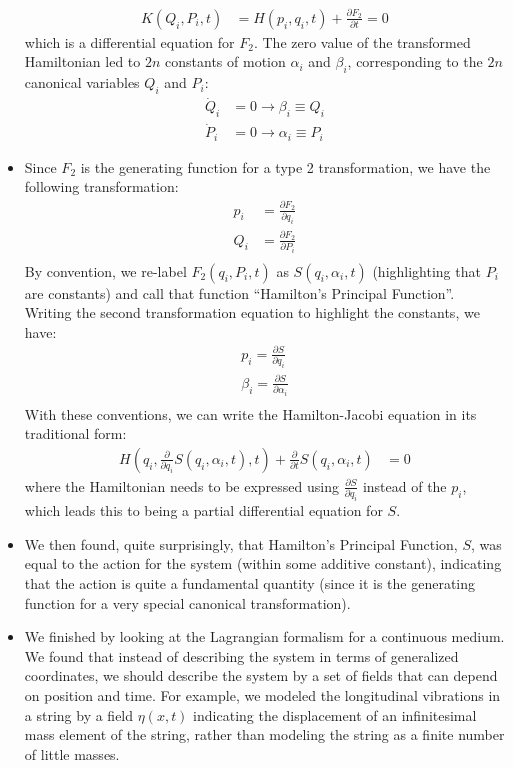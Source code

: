 \documentclass[10pt]{report}
\newcommand{\die}[2]{\frac{\partial #1}{\partial #2}}
\begin{document}
\begin{itemize}
\begin{align*}
K(Q_i,P_i,t)&=H(p_i,q_i,t)+\die{F_2}{t}=0
\end{align*}
which is a differential equation for $F_2$. The zero value of the transformed Hamiltonian led to $2n$ constants of motion $\alpha_i$ and $\beta_i$, corresponding to the $2n$ canonical variables $Q_i$ and $P_i$:
\begin{align*}
\dot Q_i&=0 \rightarrow \beta_i\equiv Q_i\\
\dot P_i&=0 \rightarrow \alpha_i\equiv P_i
\end{align*}
\item Since $F_2$ is the generating function for a type 2 transformation, we have the following transformation:
\begin{align*}
p_i&=\die{F_2}{q_i}\nonumber\\
Q_i&=\die{F_2}{P_i}\nonumber\\
\end{align*}
By convention, we re-label $F_2(q_i, P_i, t)$ as $S(q_i, \alpha_i,t)$ (highlighting that $P_i$ are constants) and call that function ``Hamilton's Principal Function''. Writing the second transformation equation to highlight the constants, we have:
\begin{align*}
p_i=\die{S}{q_i}\\
\beta_i=\die{S}{\alpha_i}\\
\end{align*}
With these conventions, we can write the Hamilton-Jacobi equation in its traditional form:
\begin{align*}
H(q_i,\die{}{q_i}S(q_i,\alpha_i,t),t)+\die{}{t}S(q_i,\alpha_i,t)&=0
\end{align*}
where the Hamiltonian needs to be expressed using $\die{S}{q_i}$ instead of the $p_i$, which leads this to being a partial differential equation for $S$.
\item We then found, quite surprisingly, that Hamilton's Principal Function, $S$, was equal to the action for the system (within some additive constant), indicating that the action is quite a fundamental quantity (since it is the generating function for a very special canonical transformation).
\item We finished by looking at the Lagrangian formalism for a continuous medium. We found that instead of describing the system in terms of generalized coordinates, we should describe the system by a set of fields that can depend on position and time. For example, we modeled the longitudinal vibrations in a string by a field $\eta(x,t)$ indicating the displacement of an infinitesimal mass element of the string, rather than modeling the string as a finite number of little masses.

\end{itemize}
\end{document}
